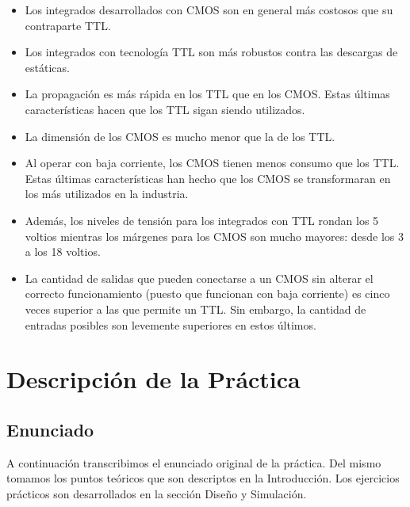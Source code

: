\documentclass[a4paper]{article}
\begin{document}
\begin{itemize}
    \item {
        Los integrados desarrollados con CMOS son en general más 
        costosos que su contraparte TTL.
    }
    \item {
        Los integrados con tecnología TTL son más robustos contra
        las descargas de estáticas.
    }
    \item {
        La propagación es más rápida en los TTL que en los CMOS. 
        Estas últimas características hacen que los TTL sigan siendo
        utilizados.
    }    
    \item {
        La dimensión de los CMOS es mucho menor que la de los TTL.
    }
    \item {
        Al operar con baja corriente, los CMOS tienen menos consumo 
        que los TTL. Estas últimas características han hecho que los 
        CMOS se transformaran en los más utilizados en la industria.
    }
    \item {
        Además, los niveles de tensión para los integrados con TTL 
        rondan los 5 voltios mientras los márgenes para los CMOS son
        mucho mayores: desde los 3 a los 18 voltios.
    }
    \item {
        La cantidad de salidas que pueden conectarse a un CMOS sin 
        alterar el correcto funcionamiento (puesto que funcionan con
        baja corriente) es cinco veces superior a las que permite un 
        TTL. Sin embargo, la cantidad de entradas posibles son 
        levemente superiores en estos últimos.
    }

\end{itemize}


\section{Descripción de la Práctica}

\subsection{Enunciado}

A continuación transcribimos el enunciado original de la práctica.
Del mismo tomamos los puntos teóricos que son descriptos en la 
Introducción. Los ejercicios prácticos son desarrollados en la sección
Diseño y Simulación.
\end{document}
